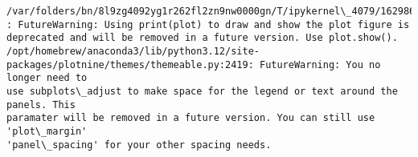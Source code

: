 \documentclass[11pt]{article}
\begin{document}
    \begin{Verbatim}[commandchars=\\\{\}]
/var/folders/bn/8l9zg4092yg1r262fl2zn9nw0000gn/T/ipykernel\_4079/1629869834.py:17
: FutureWarning: Using print(plot) to draw and show the plot figure is
deprecated and will be removed in a future version. Use plot.show().
/opt/homebrew/anaconda3/lib/python3.12/site-
packages/plotnine/themes/themeable.py:2419: FutureWarning: You no longer need to
use subplots\_adjust to make space for the legend or text around the panels. This
paramater will be removed in a future version. You can still use 'plot\_margin'
'panel\_spacing' for your other spacing needs.
    \end{Verbatim}

    \begin{center}
    \end{center}
    { \hspace*{\fill} \\}
    
    \begin{Verbatim}[commandchars=\\\{\}]

    \end{Verbatim}
\end{document}
